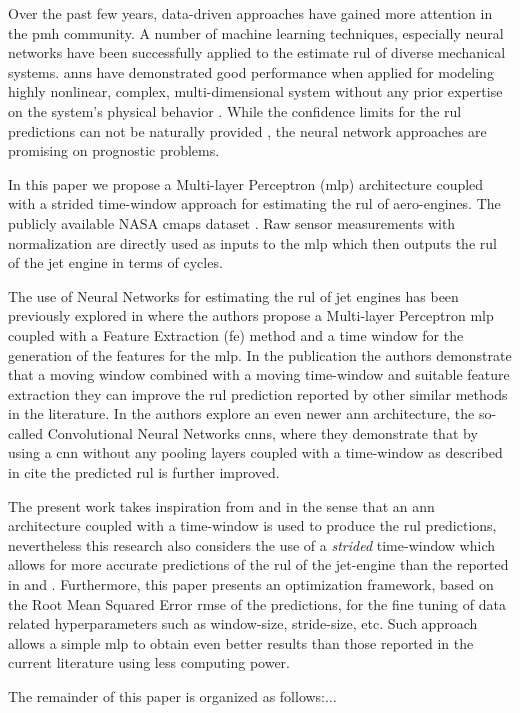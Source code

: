 Over the past few years, data-driven approaches have gained more attention in the \gls{pmh} community. A number of machine learning techniques, especially neural networks have been successfully applied to the estimate \gls{rul} of diverse mechanical systems. \glspl{ann} have demonstrated good performance when applied for modeling highly nonlinear, complex, multi-dimensional system without any prior expertise on the system's physical behavior \cite{Li2017}. While the confidence limits for the \gls{rul} predictions can not be naturally provided \cite{Sikorska2011}, the neural network approaches are promising on prognostic problems.

In this paper we propose a Multi-layer Perceptron (\gls{mlp}) architecture coupled with a strided time-window approach for estimating the \gls{rul} of aero-engines. The publicly available NASA \gls{cmaps} dataset \cite{CMAPS2008}. Raw sensor measurements with normalization are directly used as inputs to the \gls{mlp} which then outputs the \gls{rul} of the jet engine in terms of cycles. 

The use of Neural Networks for estimating the \gls{rul} of jet engines has been previously explored in \cite{Lim2016} where the authors propose a Multi-layer Perceptron \gls{mlp} coupled with a Feature Extraction (\gls{fe}) method and a time window for the generation of the features for the \gls{mlp}. In the publication the authors demonstrate that a moving window combined with a moving time-window and suitable feature extraction they can improve the \gls{rul} prediction reported by other similar methods in the literature. In \cite{Li2017} the authors explore an even newer \gls{ann} architecture, the so-called Convolutional Neural Networks \glspl{cnn}, where they demonstrate that by using a \gls{cnn} without any pooling layers coupled with a time-window as described in \cite{Lim2016} cite the predicted \gls{rul} is further improved.

The present work takes inspiration from \cite{Lim2016} and \cite{Li2017} in the sense that an \gls{ann} architecture coupled with a time-window is used to produce the \gls{rul} predictions, nevertheless this research also considers the use of a \textit{strided} time-window which allows for more accurate predictions of the \gls{rul} of the jet-engine than the reported in \cite{Lim2016} and \cite{Li2017}. Furthermore, this paper presents an optimization framework, based on the Root Mean Squared Error \gls{rmse} of the predictions, for the fine tuning of data related hyperparameters such as window-size, stride-size, etc. Such approach allows a simple \gls{mlp} to obtain even better results than those reported in the current literature using less computing power.

The remainder of this paper is organized as follows:...